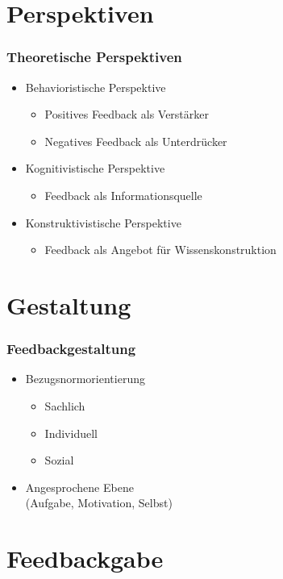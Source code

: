 \section{Perspektiven}

\begin{frame}[<+->]
	\frametitle{Theoretische Perspektiven}
	\begin{itemize}
		\item Behavioristische Perspektive
		\begin{itemize}
			\item Positives Feedback als Verstärker
			\item Negatives Feedback als Unterdrücker
		\end{itemize}
		\item Kognitivistische Perspektive
		\begin{itemize}
			\item Feedback als Informationsquelle
		\end{itemize}
		\item Konstruktivistische Perspektive
		\begin{itemize}
		\item Feedback als Angebot für Wissenskonstruktion
		\end{itemize}
	\end{itemize}
\end{frame}

\section{Gestaltung}

\begin{frame}[<+->]
	\frametitle{Feedbackgestaltung}
	\begin{itemize}
		\item Bezugsnormorientierung
		\begin{itemize}
			\item Sachlich
			\item Individuell
			\item Sozial
		\end{itemize}
		\item Angesprochene Ebene\\
			(Aufgabe, Motivation, Selbst)
	\end{itemize}
\end{frame}

\section{Feedbackgabe}

